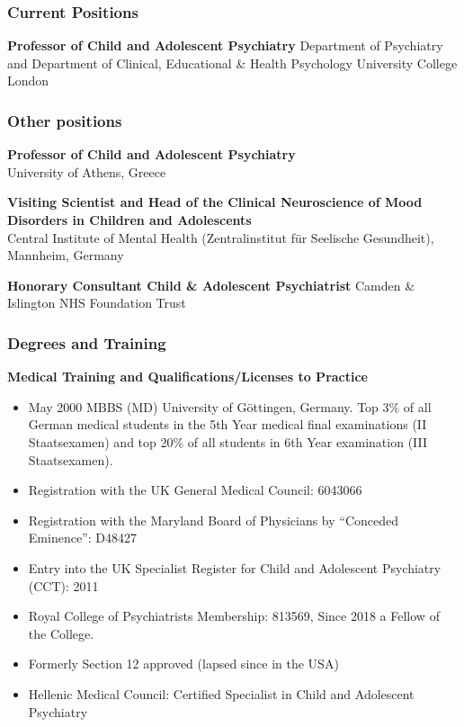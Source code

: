 \documentclass[
]{article}
\begin{document}
\hypertarget{current-positions}{%
\subsubsection{Current Positions}\label{current-positions}}

\textbf{Professor of Child and Adolescent Psychiatry} Department of
Psychiatry and Department of Clinical, Educational \& Health Psychology
University College London

\hypertarget{other-positions}{%
\subsubsection{Other positions}\label{other-positions}}

\textbf{Professor of Child and Adolescent Psychiatry}\\
University of Athens, Greece

\textbf{Visiting Scientist and Head of the Clinical Neuroscience of Mood
Disorders in Children and Adolescents}\\
Central Institute of Mental Health (Zentralinstitut für Seelische
Gesundheit), Mannheim, Germany

\textbf{Honorary Consultant Child \& Adolescent Psychiatrist} Camden \&
Islington NHS Foundation Trust

\hypertarget{degrees-and-training}{%
\subsubsection{Degrees and Training}\label{degrees-and-training}}

\textbf{Medical Training and Qualifications/Licenses to Practice}

\begin{itemize}
\item
  May 2000 MBBS (MD) University of Göttingen, Germany. Top 3\% of all
  German medical students in the 5th Year medical final examinations (II
  Staatsexamen) and top 20\% of all students in 6th Year examination
  (III Staatsexamen).
\item
  Registration with the UK General Medical Council: 6043066
\item
  Registration with the Maryland Board of Physicians by ``Conceded
  Eminence'': D48427
\item
  Entry into the UK Specialist Register for Child and Adolescent
  Psychiatry (CCT): 2011
\item
  Royal College of Psychiatrists Membership: 813569, Since 2018 a Fellow
  of the College.
\item
  Formerly Section 12 approved (lapsed since in the USA)
\item
  Hellenic Medical Council: Certified Specialist in Child and Adolescent
  Psychiatry
\end{itemize}
\end{document}
